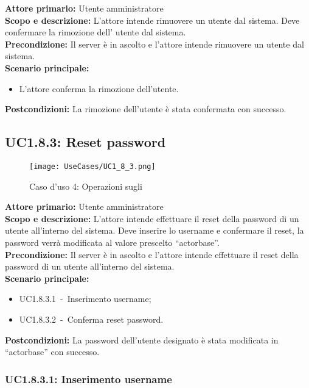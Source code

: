 \documentclass{scalatekids-article}
\begin{document}
\textbf{Attore primario:} Utente amministratore\\
\textbf{Scopo e descrizione:} L'attore intende rimuovere un utente dal sistema. Deve confermare la rimozione dell' utente dal sistema.\\
\textbf{Precondizione:} Il server è in ascolto e l'attore intende rimuovere un utente dal sistema.\\
\textbf{Scenario principale:}
\begin{itemize}
\item L'attore conferma la rimozione dell'utente.
\end{itemize}
\textbf{Postcondizioni:} La rimozione dell'utente è stata confermata con successo.

\subsection{UC1.8.3: Reset password}

\begin{figure}[H]
  \begin{center}
    \texttt{[image: UseCases/UC1\_8\_3.png]}
    \caption*{Caso d'uso 4: Operazioni sugli }
  \end{center}
\end{figure}
\textbf{Attore primario:} Utente amministratore\\
\textbf{Scopo e descrizione:} L'attore intende effettuare il reset della password di un utente all'interno del sistema. Deve inserire lo username e confermare il reset, la password
verrà modificata al valore prescelto ``actorbase''.\\
\textbf{Precondizione:} Il server è in ascolto e l'attore intende effettuare il reset della password di un utente all'interno del sistema.\\
\textbf{Scenario principale:}
\begin{itemize}
\item UC1.8.3.1\ -\ Inserimento username;
\item UC1.8.3.2\ -\ Conferma reset password.
\end{itemize}
\textbf{Postcondizioni:} La password dell'utente designato è stata modificata in ``actorbase'' con successo.

\subsubsection{UC1.8.3.1: Inserimento username}
\end{document}
